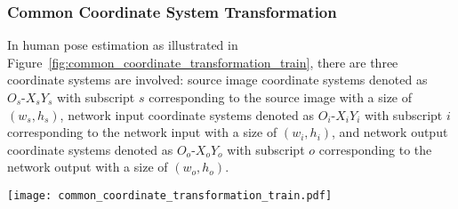 \documentclass[10pt,journal,compsoc]{IEEEtran}
\begin{document}
\subsubsection{Common Coordinate System Transformation}
In human pose estimation as illustrated in Figure~\ref{fig:common_coordinate_transformation_train}, there are three coordinate systems are involved: source image coordinate systems denoted as $O_s\text{-}X_sY_s$ with subscript $s$ corresponding to the source image with a size of $(w_s,h_s)$, network input coordinate systems denoted as $O_i\text{-}X_iY_i$ with subscript $i$ corresponding to the network input with a size of $(w_i,h_i)$, and network output coordinate systems denoted as $O_o\text{-}X_oY_o$ with subscript $o$ corresponding to the network output with a size of $(w_o,h_o)$.

\begin{figure*}[t]
    \centering
    \texttt{[image: common\_coordinate\_transformation\_train.pdf]}
    \caption{The illustration of the common coordinate system transformation in human pose estimation problem. Three coordinate system are involved: source image coordinate system $O_s\text{-}X_sY_s$, network input coordinate system $O_i\text{-}X_iY_i$ and network output coordinate system $O_o\text{-}X_oY_o$. }
    \label{fig:common_coordinate_transformation_train}
\end{figure*}
\end{document}
